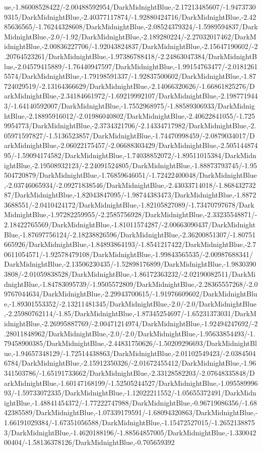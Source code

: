 {\begin{tikzternal}
{ue,-1.86008528422/-2.00488592954/DarkMidnightBlue,-2.17213485607/-1.94737309315/DarkMidnightBlue,-2.40377117874/-1.92880424716/DarkMidnightBlue,-2.4285636565/-1.76244328608/DarkMidnightBlue,-2.08524379324/-1.5989594837/DarkMidnightBlue,-2.0/-1.92/DarkMidnightBlue,-2.189280224/-2.27032017462/DarkMidnightBlue,-2.00836227706/-1.92043824837/DarkMidnightBlue,-2.15647190602/-2.20764523261/DarkMidnightBlue,-1.97386788418/-2.24863047384/DarkMidnightBlue,-2.04579415889/-1.76440947597/DarkMidnightBlue,-1.99154763477/-2.01812615574/DarkMidnightBlue,-1.79198591337/-1.92837500602/DarkMidnightBlue,-1.87724029519/-2.13164366629/DarkMidnightBlue,-2.14066320626/-1.66861825276/DarkMidnightBlue,-2.34184661972/-1.69219992107/DarkMidnightBlue,-2.1987719443/-1.64140592007/DarkMidnightBlue,-1.7552968975/-1.88589306933/DarkMidnightBlue,-2.18895916012/-2.01986040802/DarkMidnightBlue,-2.40622841055/-1.7259954773/DarkMidnightBlue,-2.3734321706/-2.14334717982/DarkMidnightBlue,-2.05971597827/-1.5136523857/DarkMidnightBlue,-1.74470998459/-2.0879034017/DarkMidnightBlue,-2.06022175457/-2.06688303429/DarkMidnightBlue,-2.50514487495/-1.59094174582/DarkMidnightBlue,-1.74038852072/-1.89511015384/DarkMidnightBlue,-2.19508932123/-2.24091524805/DarkMidnightBlue,-1.88873793745/-1.95504720879/DarkMidnightBlue,-1.76859646051/-1.72422400048/DarkMidnightBlue,-2.03746065934/-2.09271838546/DarkMidnightBlue,-2.43033714018/-1.86843273287/DarkMidnightBlue,-1.82043847095/-1.98744383473/DarkMidnightBlue,-1.88723688551/-2.0410424172/DarkMidnightBlue,-1.82105827089/-1.73470797678/DarkMidnightBlue,-1.97282259955/-2.2585756928/DarkMidnightBlue,-2.33235548871/-2.18422765569/DarkMidnightBlue,-1.81011574287/-2.00663090437/DarkMidnightBlue,-1.87697756124/-2.18238826596/DarkMidnightBlue,-2.36200851307/-1.80751665926/DarkMidnightBlue,-1.84893864193/-1.8541217422/DarkMidnightBlue,-2.70611054571/-1.92578479108/DarkMidnightBlue,-1.99843565535/-2.00987688341/DarkMidnightBlue,-2.13506230435/-1.52898176899/DarkMidnightBlue,-1.98303903808/-2.01059838528/DarkMidnightBlue,-1.86172363232/-2.02190082511/DarkMidnightBlue,-1.84783095739/-1.9505572809/DarkMidnightBlue,-2.28365557268/-2.09767044634/DarkMidnightBlue,-2.29943700615/-1.91976609602/DarkMidnightBlue,-1.89301553352/-2.13211481345/DarkMidnightBlue,-2.0/-2.0/DarkMidnightBlue,-2.25980762114/-1.85/DarkMidnightBlue,-1.87345254697/-1.65231373031/DarkMidnightBlue,-2.26995887769/-2.00471214974/DarkMidnightBlue,-1.92494247692/-2.28011848962/DarkMidnightBlue,-2.0/-2.0/DarkMidnightBlue,-1.95633854493/-1.79458900385/DarkMidnightBlue,-2.44831750626/-1.50209296693/DarkMidnightBlue,-1.94657348129/-1.72514438863/DarkMidnightBlue,-2.01102549423/-2.03845046784/DarkMidnightBlue,-2.15912350326/-2.01672455412/DarkMidnightBlue,-1.96341503786/-1.65191733662/DarkMidnightBlue,-2.33128582203/-2.07648335848/DarkMidnightBlue,-1.60147168199/-1.52505244527/DarkMidnightBlue,-1.09558999693/-1.59733072335/DarkMidnightBlue,-1.12022211552/-1.05655372491/DarkMidnightBlue,-1.48841454372/-1.77222747988/DarkMidnightBlue,-0.96719086356/-1.6842385589/DarkMidnightBlue,-1.07339179591/-1.68094320863/DarkMidnightBlue,-1.66191029384/-1.67351056588/DarkMidnightBlue,-1.15472527015/-1.26521388753/DarkMidnightBlue,-1.4620188196/-1.88564857005/DarkMidnightBlue,-1.33004200404/-1.58136378126/DarkMidnightBlue,-0.705659392}
\end{tikzternal}}
